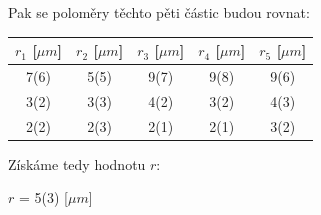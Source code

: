 \documentclass[a4paper,11pt]{article}
\begin{document}
\newpage
    \begin{minipage}[t]{0.5\textwidth} 
    Pak se poloměry těchto pěti částic budou rovnat: 
    \begin{center}
        \centering
        \begin{tabular}{|c|c|c|c|c|}
            \hline
            $r_1$ [$\mu m$] & $r_2$ [$\mu m$] & $r_3$ [$\mu m$] & $r_4$ [$\mu m$] & $r_5$ [$\mu m$] \\
            \hline
            7(6) & 5(5) & 9(7) & 9(8) & 9(6) \\
            3(2) & 3(3) & 4(2) & 3(2) & 4(3) \\
            2(2) & 2(3) & 2(1) & 2(1) & 3(2) \\
            \hline
            \end{tabular}
            \captionsetup{justification=centering, font=footnotesize}
        \vspace{15pt}
        \raggedright
        Získáme tedy hodnotu $r$:
        \begin{center}
            $r$ = 5(3) [$\mu m$]
        \end{center}
    \end{center}

\end{minipage}
\end{document}

